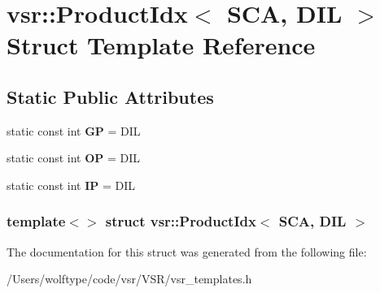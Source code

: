 \hypertarget{structvsr_1_1_product_idx_3_01_s_c_a_00_01_d_i_l_01_4}{\section{vsr\-:\-:Product\-Idx$<$ S\-C\-A, D\-I\-L $>$ Struct Template Reference}
\label{structvsr_1_1_product_idx_3_01_s_c_a_00_01_d_i_l_01_4}
}
\subsection*{Static Public Attributes}
\begin{DoxyCompactItemize}
\item 
\hypertarget{structvsr_1_1_product_idx_3_01_s_c_a_00_01_d_i_l_01_4_a7328f83c21b5b44e8d2697674d287801}{static const int {\bfseries G\-P} = D\-I\-L}\label{structvsr_1_1_product_idx_3_01_s_c_a_00_01_d_i_l_01_4_a7328f83c21b5b44e8d2697674d287801}

\item 
\hypertarget{structvsr_1_1_product_idx_3_01_s_c_a_00_01_d_i_l_01_4_a20013743b0ab108313bca1fc1228e78c}{static const int {\bfseries O\-P} = D\-I\-L}\label{structvsr_1_1_product_idx_3_01_s_c_a_00_01_d_i_l_01_4_a20013743b0ab108313bca1fc1228e78c}

\item 
\hypertarget{structvsr_1_1_product_idx_3_01_s_c_a_00_01_d_i_l_01_4_a463283f3d0ae54e927b8fb58e0065831}{static const int {\bfseries I\-P} = D\-I\-L}\label{structvsr_1_1_product_idx_3_01_s_c_a_00_01_d_i_l_01_4_a463283f3d0ae54e927b8fb58e0065831}

\end{DoxyCompactItemize}
\subsubsection*{template$<$$>$ struct vsr\-::\-Product\-Idx$<$ S\-C\-A, D\-I\-L $>$}



The documentation for this struct was generated from the following file\-:\begin{DoxyCompactItemize}
\item 
/\-Users/wolftype/code/vsr/\-V\-S\-R/vsr\-\_\-templates.\-h\end{DoxyCompactItemize}
